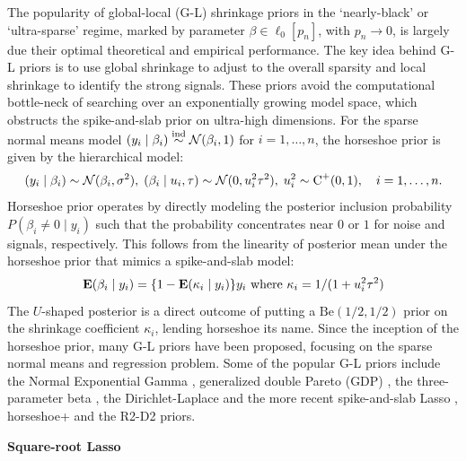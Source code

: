 \documentclass[ba]{imsart}
\begin{document}
The popularity of global-local (G-L) shrinkage priors in the `nearly-black' or `ultra-sparse' regime, marked by parameter $\beta \in \ell_0[p_n]$, with $p_n \to 0$, is largely due their optimal theoretical and empirical performance. The key idea behind G-L priors is to use global shrinkage to adjust to the overall sparsity and local shrinkage to identify the strong signals. These priors avoid the computational bottle-neck of searching over an exponentially growing model space, which obstructs the spike-and-slab prior \citep{mitchell88} on ultra-high dimensions. For the sparse normal means model $(y_i \mid \beta_i)  \stackrel{\mathrm{ind}}{\sim} \mathcal{N} (\beta_i,1)$ for $i = 1, \ldots, n$, the horseshoe prior \citep{carvalho2010horseshoe} is given by the hierarchical model: 
\[
  (y_i \mid \beta_i) \sim \mathcal{N}(\beta_i , \sigma^2), \;  (\beta_i \mid u_i, \tau) \sim 
  \mathcal{N}(0, u_i^2 \tau^2), \; u_i ^2 \sim \operatorname{C}^{+}(0,1), \quad i = 1, \ldots, n. 
\]
Horseshoe prior operates by directly modeling the posterior inclusion probability $P(\beta_i \ne 0 \mid y_i)$ such that the probability concentrates near $0$ or $1$ for noise and signals, respectively. This follows from the linearity of posterior mean under the horseshoe prior that mimics a spike-and-slab model:
\begin{equation}
{\bf E}(\beta_i \mid y_i) = \{1- {\bf E}(\kappa_i \mid y_i)\}y_i \text{ where } \kappa_i = 1/(1+u_i^2 \tau^2) \label{eq:kappa}
\end{equation}
The $U$-shaped posterior is a direct outcome of putting a $\text{Be}(1/2,1/2)$ prior on the shrinkage coefficient $\kappa_i$, lending horseshoe its name. Since the inception of the horseshoe prior, many G-L priors have been proposed, focusing on the sparse normal means and regression problem. Some of the popular G-L priors include the Normal Exponential Gamma \citep{griffin2005alternative}, generalized double Pareto (GDP) \citep{armagan2013generalized}, the three-parameter beta \citep{armagan2011generalized}, the Dirichlet-Laplace \citep{bhattacharya2014dirichlet} and the more recent spike-and-slab Lasso \citep{rovckova2016spike}, horseshoe+ \citep{bhadra2015horseshoe+} and the R2-D2 \citep{zhang2016high} priors. 


\noindent \textbf{Square-root Lasso} 
\end{document}
